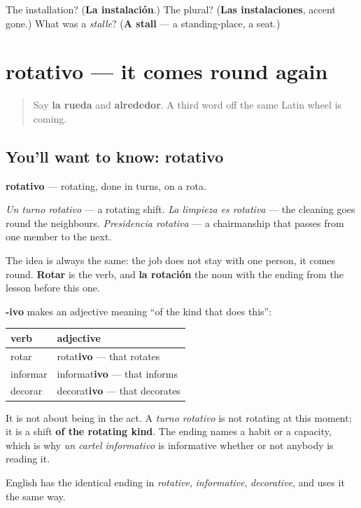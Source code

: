 \begin{tcolorbox}[breakable,colback=teal!4,colframe=teal!35!black,title={Before you move on}]
The installation? (\textbf{La instalación}.) The plural? (\textbf{Las instalaciones}, accent gone.) What was a \emph{stalle}? (\textbf{A stall} — a standing-place, a seat.)
\end{tcolorbox}
\section[rotativo]{rotativo — it comes round again}

\label{lesson:ES-C453-rotativo}



\begin{quote}
Say \textbf{la rueda} and \textbf{alrededor}. A third word off the same Latin wheel is coming.
\end{quote}

\subsection*{You'll want to know: rotativo}
\textbf{rotativo} — rotating, done in turns, on a rota.

\emph{Un turno rotativo} — a rotating shift. \emph{La limpieza es rotativa} — the cleaning goes round the neighbours. \emph{Presidencia rotativa} — a chairmanship that passes from one member to the next.

The idea is always the same: the job does not stay with one person, it comes round. \textbf{Rotar} is the verb, and \textbf{la rotación} the noun with the ending from the lesson before this one.

\begin{grammarlens}[title={Grammar Lens: -ivo describes what a thing does}]
\textbf{-ivo} makes an adjective meaning \textquotedblleft{}of the kind that does this\textquotedblright{}:

\noindent
\begin{tabularx}{\linewidth}{@{}>{\raggedright\arraybackslash}X>{\raggedright\arraybackslash}X@{}}
\toprule
\textbf{verb} & \textbf{adjective} \\
\midrule
rotar & rotat\textbf{ivo} — that rotates \\
informar & informat\textbf{ivo} — that informs \\
decorar & decorat\textbf{ivo} — that decorates \\
\bottomrule
\end{tabularx}

It is not about being in the act. A \emph{turno rotativo} is not rotating at this moment; it is a shift \textbf{of the rotating kind}. The ending names a habit or a capacity, which is why \emph{un cartel informativo} is informative whether or not anybody is reading it.

English has the identical ending in \emph{rotative}, \emph{informative}, \emph{decorative}, and uses it the same way.
\end{grammarlens}

